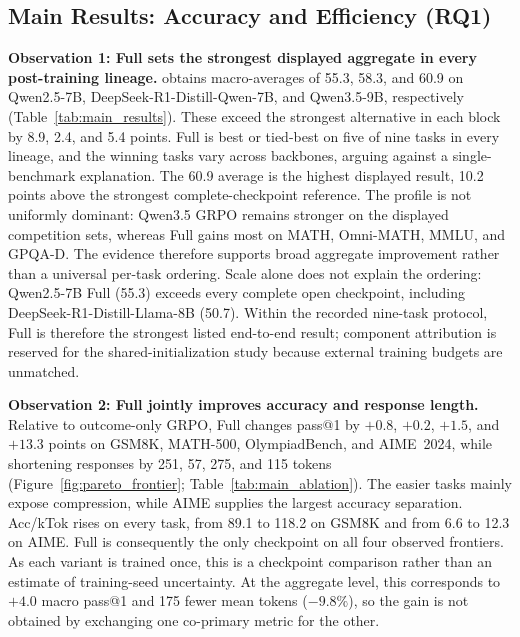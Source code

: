 \FloatBarrier


\subsection{Main Results: Accuracy and Efficiency (RQ1)}
\label{sec:rq1}

\noindent\textbf{Observation 1: Full sets the strongest displayed aggregate in every post-training lineage.}
\method obtains macro-averages of 55.3, 58.3, and 60.9 on Qwen2.5-7B, DeepSeek-R1-Distill-Qwen-7B, and Qwen3.5-9B, respectively (Table~\ref{tab:main_results}). These exceed the strongest alternative in each block by 8.9, 2.4, and 5.4 points. Full is best or tied-best on five of nine tasks in every lineage, and the winning tasks vary across backbones, arguing against a single-benchmark explanation. The 60.9 average is the highest displayed result, 10.2 points above the strongest complete-checkpoint reference. The profile is not uniformly dominant: Qwen3.5 GRPO remains stronger on the displayed competition sets, whereas Full gains most on MATH, Omni-MATH, MMLU, and GPQA-D. The evidence therefore supports broad aggregate improvement rather than a universal per-task ordering.
Scale alone does not explain the ordering: Qwen2.5-7B Full (55.3) exceeds every complete open checkpoint, including DeepSeek-R1-Distill-Llama-8B (50.7). Within the recorded nine-task protocol, Full is therefore the strongest listed end-to-end result; component attribution is reserved for the shared-initialization study because external training budgets are unmatched.

\smallskip
\noindent\textbf{Observation 2: Full jointly improves accuracy and response length.}
Relative to outcome-only GRPO, Full changes pass@1 by $+0.8$, $+0.2$, $+1.5$, and $+13.3$ points on GSM8K, MATH-500, OlympiadBench, and AIME~2024, while shortening responses by 251, 57, 275, and 115 tokens (Figure~\ref{fig:pareto_frontier}; Table~\ref{tab:main_ablation}). The easier tasks mainly expose compression, while AIME supplies the largest accuracy separation. Acc/kTok rises on every task, from 89.1 to 118.2 on GSM8K and from 6.6 to 12.3 on AIME. Full is consequently the only checkpoint on all four observed frontiers. As each variant is trained once, this is a checkpoint comparison rather than an estimate of training-seed uncertainty.
At the aggregate level, this corresponds to $+4.0$ macro pass@1 and 175 fewer mean tokens ($-9.8\%$), so the gain is not obtained by exchanging one co-primary metric for the other.

